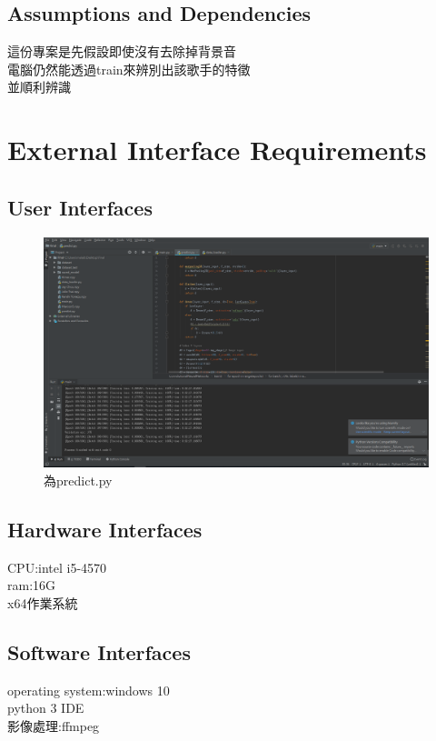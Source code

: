 \documentclass{article}
\begin{document}
\begin{CJK}{UTF8}{bkai}
\subsection{\Large  Assumptions and Dependencies\\}
  \Large  這份專案是先假設即使沒有去除掉背景音\\
 電腦仍然能透過train來辨別出該歌手的特徵\\
並順利辨識

\newpage

\section{\huge\bf  \color{blue} External Interface Requirements\\}
\subsection{\Large User Interfaces\\}
\begin{figure}[h]
\begin{center}
\includegraphics[width=15cm]{software.png}
\end{center}
\caption{為predict.py}
\label{fig:1}
\end{figure}
\subsection{\Large Hardware Interfaces\\}
CPU:intel i5-4570\\
ram:16G\\
x64作業系統\\

\newpage
\subsection{\Large Software Interfaces\\}
operating system:windows 10\\
python 3 IDE \\
影像處理:ffmpeg\\


\end{CJK}
\end{document}
